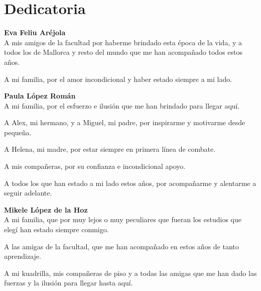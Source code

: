 
\chapter*{Dedicatoria}

\begin{flushright}
    \begin{minipage}{8.5cm}
        \itshape

        \textbf{Eva Feliu Aréjola} \\
        A mis amigos de la facultad por haberme brindado esta época de la vida, y a todos los de Mallorca y resto del mundo que me han acompañado todos estos años. 
        
        A mi familia, por el amor incondicional y haber estado siempre a mi lado.

        \vspace{1.5em}

        \textbf{Paula López Román} \\
        A mi familia, por el esfuerzo e ilusión que me han brindado para llegar aquí.

        A Alex, mi hermano, y a Miguel, mi padre, por inspirarme y motivarme desde pequeña. 
        
        A Helena, mi madre, por estar siempre en primera línea de combate.

        A mis compañeras, por su confianza e incondicional apoyo. 

        A todos los que han estado a mi lado estos años, por acompañarme y alentarme a seguir adelante.

        \vspace{1.5em}

        \textbf{Mikele López de la Hoz} \\
        A mi familia, que por muy lejos o muy peculiares que fueran los estudios que elegí han estado siempre conmigo. 
        
        A las amigas de la facultad, que me han acompañado en estos años de tanto aprendizaje.
        
        A mi kuadrilla, mis compañeras de piso y a todas las amigas que me han dado las fuerzas y la ilusión para llegar hasta aquí. 
        
    \end{minipage}
\end{flushright}